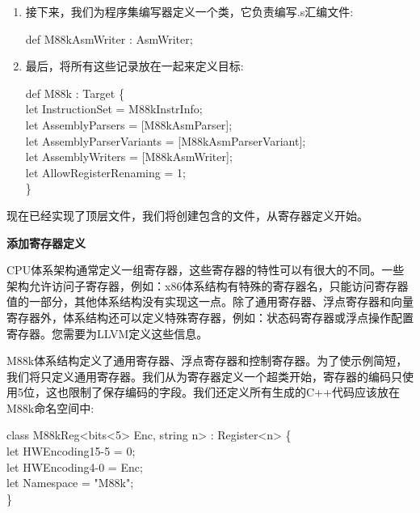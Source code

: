 \begin{enumerate}
\item 接下来，我们为程序集编写器定义一个类，它负责编写.s汇编文件:
\begin{tcolorbox}[colback=white,colframe=black]
def M88kAsmWriter : AsmWriter;
\end{tcolorbox}

\item 最后，将所有这些记录放在一起来定义目标:
\begin{tcolorbox}[colback=white,colframe=black]
def M88k : Target \{ \\
\hspace*{1cm}let InstructionSet = M88kInstrInfo; \\
\hspace*{1cm}let AssemblyParsers = [M88kAsmParser]; \\
\hspace*{1cm}let AssemblyParserVariants = [M88kAsmParserVariant]; \\
\hspace*{1cm}let AssemblyWriters = [M88kAsmWriter]; \\
\hspace*{1cm}let AllowRegisterRenaming = 1; \\
\}
\end{tcolorbox}

\end{enumerate}

现在已经实现了顶层文件，我们将创建包含的文件，从寄存器定义开始。\par

\hspace*{\fill} \par %
\textbf{添加寄存器定义}

CPU体系架构通常定义一组寄存器，这些寄存器的特性可以有很大的不同。一些架构允许访问子寄存器，例如：x86体系结构有特殊的寄存器名，只能访问寄存器值的一部分，其他体系结构没有实现这一点。除了通用寄存器、浮点寄存器和向量寄存器外，体系结构还可以定义特殊寄存器，例如：状态码寄存器或浮点操作配置寄存器。您需要为LLVM定义这些信息。\par

M88k体系结构定义了通用寄存器、浮点寄存器和控制寄存器。为了使示例简短，我们将只定义通用寄存器。我们从为寄存器定义一个超类开始，寄存器的编码只使用5位，这也限制了保存编码的字段。我们还定义所有生成的C++代码应该放在M88k命名空间中:\par

\begin{tcolorbox}[colback=white,colframe=black]
class M88kReg<bits<5> Enc, string n> : Register<n> \{ \\
\hspace*{1cm}let HWEncoding{15-5} = 0; \\
\hspace*{1cm}let HWEncoding{4-0} = Enc; \\
\hspace*{1cm}let Namespace = "M88k"; \\
\}
\end{tcolorbox}

